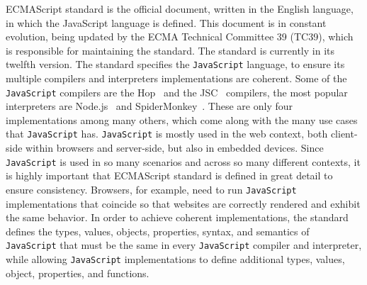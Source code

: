 \documentclass[runningheads]{llncs}
\begin{document}
ECMAScript standard\cite{ECMAScriptStandard} is the official document, written in the English language, in which the JavaScript language is defined. This document is in constant evolution, being updated by the ECMA Technical Committee 39 (TC39), which is responsible for maintaining the standard. The standard is currently in its twelfth version.
%
The standard specifies the \texttt{JavaScript} language, to ensure its multiple compilers and interpreters implementations are coherent. Some of the \texttt{JavaScript} compilers are the Hop~\cite{Hop} and the JSC~\cite{JSC} compilers, the most popular interpreters are Node.js~\cite{Node.js} and SpiderMonkey~\cite{SpiderMonkey}. These are only four implementations among many others, which come along with the many use cases that \texttt{JavaScript} has.
%
\texttt{JavaScript} is mostly used in the web context, both client-side within browsers and server-side, but also in embedded devices. Since \texttt{JavaScript} is used in so many scenarios and across so many different contexts, it is highly important that ECMAScript standard is defined in great detail to ensure consistency. Browsers, for example, need to run \texttt{JavaScript} implementations that coincide so that websites are correctly rendered and exhibit the same behavior. In order to achieve coherent implementations, the standard defines the types, values, objects, properties, syntax, and semantics of \texttt{JavaScript} that must be the same in every \texttt{JavaScript} compiler and interpreter, while allowing \texttt{JavaScript} implementations to define additional types, values, object, properties, and functions.
\end{document}
